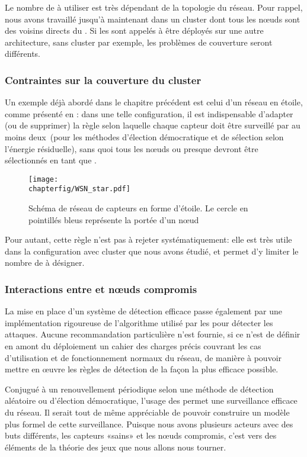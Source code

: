 Le nombre de \cns à utiliser est très dépendant de la topologie du réseau.
Pour rappel, nous avons travaillé jusqu'à maintenant dans un cluster dont tous les nœuds sont des voisins directs du \ch.
Si les \cns sont appelés à être déployés sur une autre architecture, sans cluster par exemple, les problèmes de couverture seront différents.

        \subsubsection{Contraintes sur la couverture du cluster}
Un exemple déjà abordé dans le chapitre précédent est celui d'un réseau en étoile, comme présenté en : dans une telle configuration, il est indispensable d'adapter (ou de supprimer) la règle selon laquelle chaque capteur doit être surveillé par au moins deux~\cns (pour les méthodes d'élection démocratique et de sélection selon l'énergie résiduelle), sans quoi tous les nœuds ou presque devront être sélectionnés en tant que \cns.
\begin{figure}[!ht]
    \centering
    \texttt{[image: \\chapterfig/WSN\_star.pdf]}
    \caption{Schéma de réseau de capteurs en forme d'étoile. Le cercle en pointillés bleus représente la portée d'un nœud}\label{sd:fig:star}
\end{figure}
Pour autant, cette règle n'est pas à rejeter systématiquement: elle est très utile dans la configuration avec cluster que nous avons étudié, et permet d'y limiter le nombre de \cns à désigner.

        \subsubsection{Interactions entre \cns et nœuds compromis}
La mise en place d'un système de détection efficace passe également par une implémentation rigoureuse de l'algorithme utilisé par les \cns pour détecter les attaques.
Aucune recommandation particulière n'est fournie, si ce n'est de définir en amont du déploiement un cahier des charges précis couvrant les cas d'utilisation et de fonctionnement normaux du réseau, de manière à pouvoir mettre en œuvre les règles de détection de la façon la plus efficace possible.

Conjugué à un renouvellement périodique selon une méthode de détection aléatoire ou d'élection démocratique, l'usage des \cns permet une surveillance efficace du réseau.
Il serait tout de même appréciable de pouvoir construire un modèle plus formel de cette surveillance.
Puisque nous avons plusieurs acteurs avec des buts différents, les capteurs «sains» et les nœuds compromis, c'est vers des éléments de la théorie des jeux que nous allons nous tourner.
